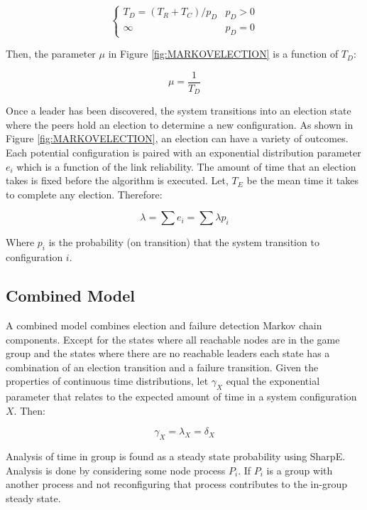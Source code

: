 \begin{equation}
\begin{cases}
T_{D} = ( T_{R}+T_{C} ) / p_{D} & p_{D} > 0 \\
\infty & p_{D} = 0
\end{cases}
\end{equation}

Then, the parameter $\mu$ in Figure \ref{fig:MARKOVELECTION} is a function of $T_{D}$:

\begin{equation}
\mu = \frac{1}{T_{D}}
\end{equation}

Once a leader has been discovered, the system transitions into an election state where the peers
hold an election to determine a new configuration. As shown in Figure \ref{fig:MARKOVELECTION},
an election can have a variety of outcomes. Each potential configuration is paired with an exponential distribution parameter
$e_{i}$ which is a function of the link reliability. The amount of time that an election takes is fixed
before the algorithm is executed. Let, $T_{E}$ be the mean time it takes to complete any election. Therefore:

\begin{equation}
\lambda = \sum e_{i} = \sum \lambda p_{i}
\end{equation}

Where $p_{i}$ is the probability (on transition) that the system transition to configuration $i$.

\subsection{Combined Model}

A combined model combines election and failure detection Markov chain components. Except for the
states where all reachable nodes are in the game group and the states where there are no reachable
leaders each state has a combination of an election transition and a failure transition. Given the
properties of continuous time distributions, let $\gamma_{X}$ equal the exponential parameter that
relates to the expected amount of time in a system configuration $X$. Then:

\begin{equation}
\gamma_{X} = \lambda_{X} = \delta_{X}
\end{equation}

Analysis of time in group is found as a steady state probability using SharpE. Analysis is done by
considering some node process $P_{i}$. If $P_{i}$ is a group with another process and not reconfiguring
that process contributes to the in-group steady state.
